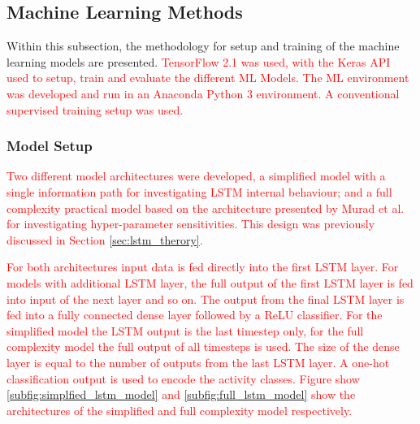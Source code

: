 \documentclass[sensors,article,submit,moreauthors,pdftex]{Definitions/mdpi}
\begin{document}
\subsection{Machine Learning Methods}
\label{sec:machine_Learning}
Within this subsection, the methodology for setup and training of the machine learning models are presented. \textcolor{red}{TensorFlow 2.1 was used, with the Keras API used to setup, train and evaluate the different ML Models. The ML environment was developed and run in an Anaconda Python 3 environment. A conventional supervised training setup was used.} 

\subsubsection{Model Setup}
\label{subsubsec:model_setup}
\textcolor{red}{Two different model architectures were developed, a simplified model with a single information path for investigating LSTM internal behaviour; and a full complexity practical model based on the architecture presented by Murad et al.\cite{Murad2017} for investigating hyper-parameter sensitivities. This design was previously discussed in Section \ref{sec:lstm_therory}.}

\textcolor{red}{For both architectures input data is fed directly into the first LSTM layer. For models with additional LSTM layer, the full output of the first LSTM layer is fed into input of the next layer and so on. The output from the final LSTM layer is fed into a fully connected dense layer followed by a ReLU classifier. For the simplified model the LSTM output is the last timestep only, for the full complexity model the full output of all timesteps is used. The size of the dense layer is equal to the number of outputs from the last LSTM layer. A one-hot classification output is used to encode the activity classes. Figure show \ref{subfig:simplfied_lstm_model} and \ref{subfig:full_lstm_model} show the architectures of the simplified and full complexity model respectively.}
\end{document}
